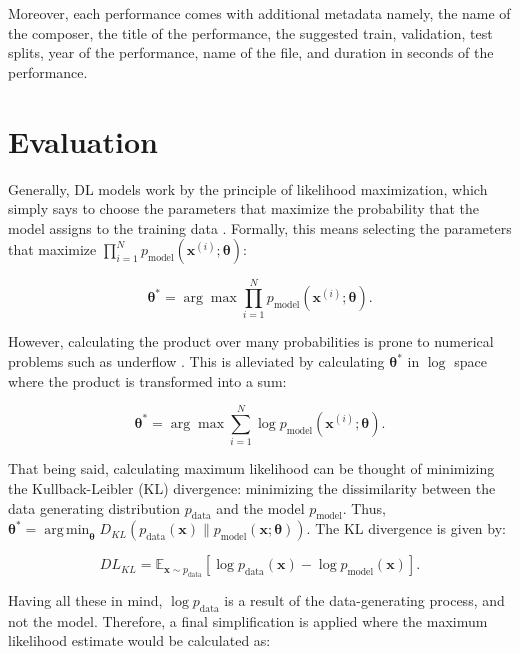 \documentclass[a4paper]{book}
\DeclareMathOperator*{\argmin}{arg\,min}
\begin{document}
Moreover, each performance comes with additional metadata namely, the name of the composer, the title of the performance, the suggested train, validation, test splits, year of the performance, name of the file, and duration in seconds of the performance.

\section{Evaluation}

Generally, DL models work by the principle of likelihood maximization, which simply says to choose the parameters that maximize the probability that the model assigns to the training data \parencite{goodfellow_nips_2016}. Formally, this means selecting the parameters that maximize $\prod_{i=1}^N p_{\text{model}}(\bm{x}^{(i)}; \bm{\theta})$:

\begin{equation}
    \bm{\theta^*} = \arg \max \prod_{i=1}^N p_{\text{model}}(\bm{x}^{(i)}; \bm{\theta}) \label{eq:og_mle}.
\end{equation}

However, calculating the product over many probabilities is prone to numerical problems such as underflow \parencite{goodfellow_nips_2016}. This is alleviated by calculating $\bm{\theta^*}$ in $\log$ space where the product is transformed into a sum:

\begin{equation}
    \bm{\theta^*} = \arg \max \sum_{i=1}^N \log p_{\text{model}}(\bm{x}^{(i)}; \bm{\theta}) \label{eg:log_mle}.
\end{equation}

That being said, calculating maximum likelihood can be thought of minimizing the Kullback-Leibler (KL) divergence: minimizing the dissimilarity between the data generating distribution $p_{\text{data}}$ and the model $p_{\text{model}}$. Thus, $\bm{\theta^*} = \argmin_{\bm{\theta}} D_{KL}(p_{\text{data}}(\bm{x}) \| p_{\text{model}} (\bm{x}; \bm{\theta}))$. The KL divergence is given by:

\begin{equation}
    DL_{KL} = \mathbb{E}_{\mathbf{x} \sim p_{\text{data}}} [\log p_{\text{data}} (\bm{x}) - \log p_{\text{model}} (\bm{x})] \label{eq:kl_div}.
\end{equation}

Having all these in mind, $\log p_{\text{data}}$ is a result of the data-generating process, and not the model. Therefore, a final simplification is applied where the maximum likelihood estimate would be calculated as:
\end{document}
